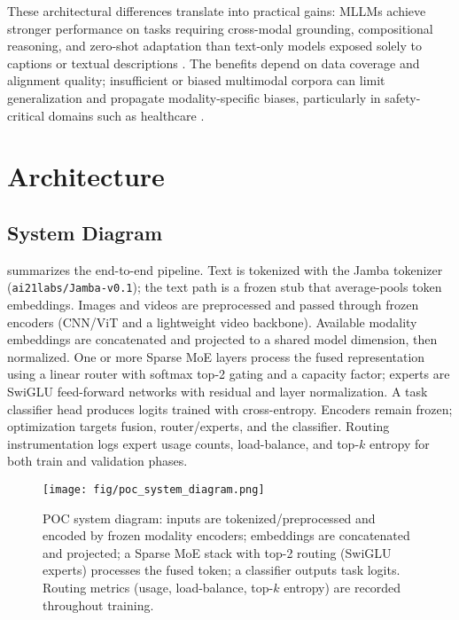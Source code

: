 \documentclass[11pt,a4paper]{article}
\begin{document}
These architectural differences translate into practical gains: MLLMs achieve stronger performance on tasks requiring cross-modal grounding, compositional reasoning, and zero-shot adaptation than text-only models exposed solely to captions or textual descriptions \cite{gargbas2023_performance_mllm,bai2024_revolution_mllm}. The benefits depend on data coverage and alignment quality; insufficient or biased multimodal corpora can limit generalization and propagate modality-specific biases, particularly in safety-critical domains such as healthcare \cite{niu2024_data_centric_mllm,carolan2024_medical_mllm}.

\section{Architecture}
\subsection{System Diagram}
 summarizes the end-to-end pipeline. Text is tokenized with the Jamba tokenizer (\texttt{ai21labs/Jamba-v0.1})\cite{jamba2024}; the text path is a frozen stub that average-pools token embeddings. Images and videos are preprocessed and passed through frozen encoders (CNN/ViT and a lightweight video backbone). Available modality embeddings are concatenated and projected to a shared model dimension, then normalized. One or more Sparse MoE layers process the fused representation using a linear router with softmax top-2 gating and a capacity factor; experts are SwiGLU feed-forward networks with residual and layer normalization. A task classifier head produces logits trained with cross-entropy. Encoders remain frozen; optimization targets fusion, router/experts, and the classifier. Routing instrumentation logs expert usage counts, load-balance, and top-$k$ entropy for both train and validation phases.

\begin{figure}[t]
  \centering
  \texttt{[image: fig/poc\_system\_diagram.png]}
  \caption{POC system diagram: inputs are tokenized/preprocessed and encoded by frozen modality encoders; embeddings are concatenated and projected; a Sparse MoE stack with top-2 routing (SwiGLU experts) processes the fused token; a classifier outputs task logits. Routing metrics (usage, load-balance, top-$k$ entropy) are recorded throughout training.}
  \label{fig:system-diagram}
\end{figure}
\end{document}
